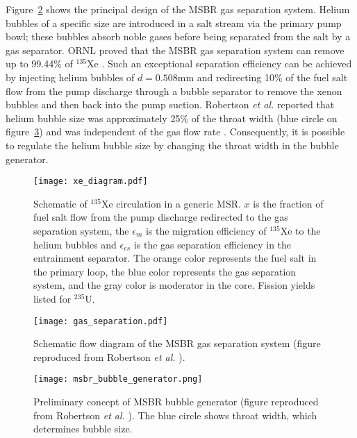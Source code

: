 
Figure~\ref{fig:gas_removal_system} shows the principal design of the  
\gls{MSBR} gas separation system. Helium bubbles of a specific size are 
introduced in a salt stream via the primary pump bowl; these bubbles absorb 
noble gases before being separated from the salt by a gas separator. 
\gls{ORNL} proved that the \gls{MSBR} gas separation system can remove up to 
99.44\% of $^{135}$Xe \cite{briggs_molten-salt_1969}. Such an exceptional 
separation efficiency can be achieved by injecting helium bubbles of 
$d=0.508$mm and redirecting 10\% of the fuel salt flow from the pump discharge 
through a bubble separator to remove the xenon bubbles and then back into the 
pump suction. Robertson \emph{et al.} reported that helium bubble size was 
approximately 25\% of the throat width (blue circle on 
figure~\ref{fig:bubble_separator}) and was independent of the gas flow rate 
\cite{robertson_conceptual_1971}. Consequently, it is possible to regulate the 
helium bubble size by changing the throat width in the bubble generator.
\begin{figure}[htp!] %
	\centering
	\texttt{[image: xe\_diagram.pdf]}
	\caption{Schematic of $^{135}$Xe circulation in a generic \gls{MSR}. 
	$x$ is the fraction of fuel salt flow from the pump discharge redirected to 
	the gas separation system, the $\epsilon_m$ is the migration efficiency of 
	$^{135}$Xe to the helium bubbles and $\epsilon_{es}$ is the gas separation 
	efficiency in the entrainment separator. The orange color represents the 
	fuel salt in the primary loop,	the blue color represents the gas 
	separation system, and the gray color is moderator in the core. Fission 
	yields listed for $^{235}$U.}
	\label{fig:xe_diagram}
\end{figure}
\begin{figure}[htp!] %
  \centering
  \texttt{[image: gas\_separation.pdf]}
  \caption{Schematic flow diagram of the \gls{MSBR} gas separation system 
  (figure reproduced from Robertson \emph{et al.} 
  \cite{robertson_conceptual_1971}).}
  \label{fig:gas_removal_system}
\end{figure}
\begin{figure}[htp!] %
  \centering
  \texttt{[image: msbr\_bubble\_generator.png]}
  \caption{Preliminary concept of \gls{MSBR} bubble generator (figure 
  reproduced from Robertson \emph{et al.} \cite{robertson_conceptual_1971}). 
  The blue circle shows throat width, which determines bubble size.}
		\vspace{-0.25in}
  \label{fig:bubble_separator}
\end{figure}
